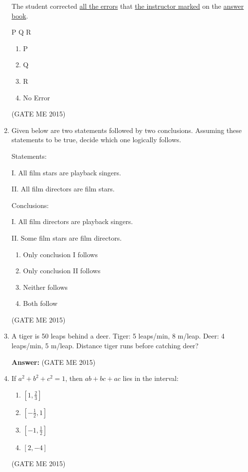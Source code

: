 \documentclass[journal]{IEEEtran}
\begin{document}
\begin{enumerate}
 The student corrected \underline{all the errors} that \underline{the instructor marked} on the \underline{answer book}.

\hfill P \hfill Q \hfill R
\begin{multicols}{4}
\begin{enumerate}
\item P  
\item Q  
\item R  
\item No Error  
\end{enumerate}
\end{multicols}
\hfill  (GATE ME 2015)

\item Given below are two statements followed by two conclusions. Assuming these statements to be true, decide which one logically follows.

Statements:  

I. All film stars are playback singers. 

II. All film directors are film stars. 

Conclusions: 

I. All film directors are playback singers.

II. Some film stars are film directors.

\begin{enumerate}
\item Only conclusion I follows  
\item Only conclusion II follows  
\item Neither follows  
\item Both follow  
\end{enumerate}
\hfill  (GATE ME 2015)

\item A tiger is 50 leaps behind a deer. Tiger: 5 leaps/min, 8 m/leap. Deer: 4 leaps/min, 5 m/leap. Distance tiger runs before catching deer?  

\textbf{Answer:} 
\hfill  (GATE ME 2015)

\item If $ a^2 + b^2 + c^2 = 1 $, then $ ab + bc + ac $ lies in the interval:

\begin{enumerate}
\item $ [1, \frac{2}{3}] $  
\item $ [-\frac{1}{2}, 1] $  
\item $ [-1, \frac{1}{2}] $  
\item $ [2, -4] $    
\end{enumerate}
\hfill  (GATE ME 2015)


\end{enumerate}
\end{document}
